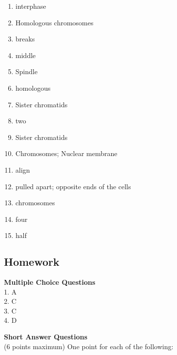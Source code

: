 \documentclass[
]{book}
\providecommand{\tightlist}{%
  \setlength{\itemsep}{0pt}\setlength{\parskip}{0pt}}
\begin{document}
\begin{enumerate}
\def\labelenumi{\arabic{enumi}.}
\tightlist
\item
  interphase\\
\item
  Homologous chromosomes\\
\item
  breaks\\
\item
  middle\\
\item
  Spindle\\
\item
  homologous\\
\item
  Sister chromatids\\
\item
  two\\
\item
  Sister chromatids\\
\item
  Chromosomes; Nuclear membrane\\
\item
  align\\
\item
  pulled apart; opposite ends of the cells\\
\item
  chromosomes\\
\item
  four\\
\item
  half
\end{enumerate}

\hypertarget{homework-2}{%
\subsection{Homework}\label{homework-2}}

\textbf{Multiple Choice Questions}\\
1. A\\
2. C\\
3. C\\
4. D

\textbf{Short Answer Questions}\\
(6 points maximum) One point for each of the following:
\end{document}
